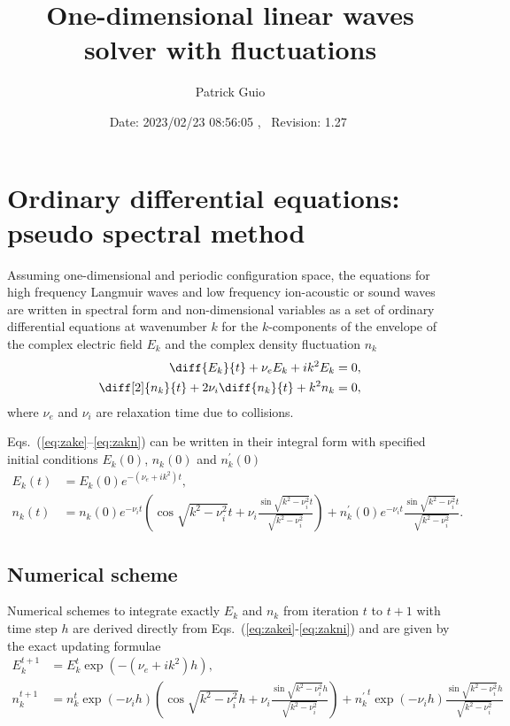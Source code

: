 \documentclass[10pt,a4paper]{article}
\title{One-dimensional linear waves solver with fluctuations}
\author{Patrick Guio}
\date{\normalsize$ $Date: 2023/02/23 08:56:05 $ $,~ $ $Revision: 1.27 $ $}
\newcommand{\eqs}[1]{Eqs.~(#1)}
\def\knui{\sqrt{k^2{-}\nu_i^2}}
\begin{document}
\maketitle

\section{Ordinary differential equations: pseudo spectral method}

Assuming one-dimensional and periodic configuration space, the equations for high frequency 
Langmuir waves and low frequency ion-acoustic or sound waves are written in spectral form and
non-dimensional variables as a set of ordinary differential equations at wavenumber $k$ 
for the $k$-components of the envelope of the complex electric field $E_k$ and the complex density
fluctuation $n_k$
\begin{align}
\diff{E_k}{t} + \nu_eE_k + ik^2E_k &= 0, \label{eq:zake}\\
\diff[2]{n_k}{t} + 2\nu_i\diff{n_k}{t} + k^2n_k &= 0,  \label{eq:zakn}
\end{align}
where $\nu_e$ and $\nu_i$ are relaxation time due to collisions.

\eqs{\ref{eq:zake}--\ref{eq:zakn}} can be written in their integral form with specified initial
conditions $E_k(0)$, $n_k(0)$ and $n_k^\prime(0)$
\begin{align}
E_k(t) &= E_k(0) e^{-(\nu_e{+}ik^2)t}, \label{eq:zakei}\\
n_k(t) &= n_k(0) e^{-\nu_it}\left(\cos\knui t+\nu_i\frac{\sin\knui t}{\knui}\right)+
          n_k^\prime(0) e^{-\nu_it}\frac{\sin\knui t}{\knui}. \label{eq:zakni}
\end{align}

\subsection{Numerical scheme}

Numerical schemes to integrate exactly $E_k$ and $n_k$ from iteration $t$ to $t+1$ with
time step $h$ are derived directly from \eqs{\ref{eq:zakei}-\ref{eq:zakni}} and are given by
the exact updating formulae
\begin{align}
E_k^{t+1} &= E_k^t\exp\left(-(\nu_e+ik^2)h\right), \label{eq:Eknum}\\
n_k^{t+1} &= n_k^t\exp(-\nu_ih)\left(\cos\knui h+ \nu_i\frac{\sin\knui h}{\knui}\right)+
{n_k^\prime}^t\exp(-\nu_ih)\frac{\sin\knui h}{\knui} \label{eq:nknum}
\end{align}
\end{document}
